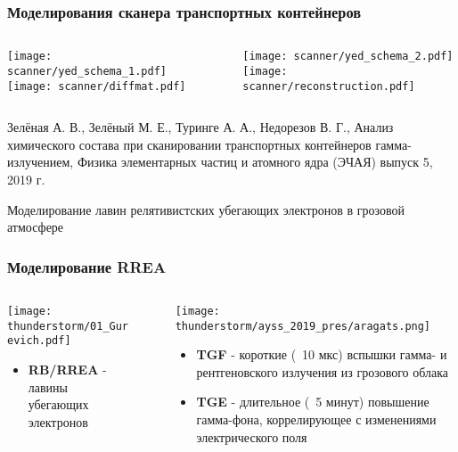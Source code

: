 \begin{frame}
\frametitle{Моделирования сканера транспортных контейнеров}
\begin{columns}
    \begin{column}{0.5\textwidth}
        \texttt{[image: scanner/yed\_schema\_1.pdf]}
        \texttt{[image: scanner/diffmat.pdf]}
    \end{column}
    \vline~
    \begin{column}{0.5\textwidth} 
        \texttt{[image: scanner/yed\_schema\_2.pdf]}
        \texttt{[image: scanner/reconstruction.pdf]}
    \end{column}
\end{columns}  

\tiny {Зелёная А. В., Зелёный М. Е., Туринге А. А., Недорезов В. Г., Анализ химического состава при сканировании транспортных контейнеров гамма-излучением, Физика элементарных частиц и атомного ядра (ЭЧАЯ) выпуск 5, 2019 г.}
\end{frame}



\begin{frame}
\begin{center}
    \Huge
   Моделирование лавин релятивистских убегающих электронов в грозовой атмосфере
\end{center}
\end{frame}

\begin{frame}
\frametitle{Моделирование RREA}
\begin{columns}
    \begin{column}{0.5\textwidth}
        \texttt{[image: thunderstorm/01\_Gurevich.pdf]}
        \begin{itemize}
            \item \textbf{RB/RREA} - лавины убегающих электронов
        \end{itemize}
    \end{column}
    \vline~
    \begin{column}{0.5\textwidth} 
        \texttt{[image: thunderstorm/ayss\_2019\_pres/aragats.png]}
        \begin{itemize}
           \item \textbf{TGF} - короткие (~10 мкс) вспышки гамма- и рентгеновского излучения из грозового облака
           \item \textbf{TGE} - длительное (~5 минут) повышение гамма-фона, коррелирующее с изменениями электрического поля
        \end{itemize}

    \end{column}
\end{columns}  
\end{frame}

